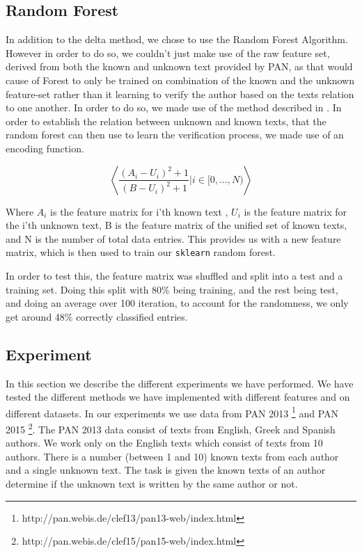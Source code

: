 \subsection{Random Forest}
In addition to the delta method, we chose to use the Random Forest Algorithm.
However in order to do so, we couldn't just make use of the raw feature set,
derived from both the known and unknown text provided by PAN, as that would
cause of Forest to only be trained on combination of the known and the unknown
feature-set rather than it learning to verify the author based on the texts
relation to one another. In order to do so, we made use of the method described
in \cite{pacheco2015}. In order to establish the relation between unknown and
known texts, that the random forest can then use to learn the verification
process, we made use of an encoding function.

$$
\left\langle \dfrac{(A_i-U_i)^2+1}{(B-U_i)^2+1}|i \in [0,\dots, N)\right\rangle
$$

Where $A_i$ is the feature matrix for i'th known text , $U_i$ is the feature
matrix for the i'th unknown text, B is the feature matrix of the unified set of
known texts, and N is the number of total data entries. This provides us with
a new feature matrix, which is then used to train our \texttt{sklearn} random
forest.

In order to test this, the feature matrix was shuffled and split into a test and
a training set. Doing this split with 80\% being training, and the rest being
test, and doing an average over 100 iteration, to account for the randomness, we
only get around 48\% correctly classified entries.

\subsection{Experiment}
In this section we describe the different experiments we have performed.
We have tested the different methods we have implemented with different
features and on different datasets. In our experiments we use data from PAN
2013 \footnote{http://pan.webis.de/clef13/pan13-web/index.html} and PAN 2015
\footnote{http://pan.webis.de/clef15/pan15-web/index.html}. The PAN 2013 data
consist of texts from English, Greek and Spanish authors. We work only on the
English texts which consist of texts from 10 authors. There is a number (between
1 and 10) known texts from each author and a single unknown text. The task is
given the known texts of an author determine if the unknown text is written by
the same author or not.

